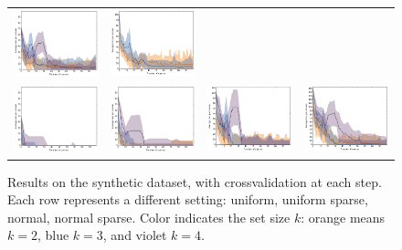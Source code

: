 \documentclass{article}
\renewcommand\[{\begin{equation}}
\renewcommand\]{\end{equation}}
\begin{document}
\begin{figure}[b]
\begin{tabular}{cccc}
        \includegraphics[width=12em]{figures/synthetic_5_normal_cv1_loss} &
        \includegraphics[width=12em]{figures/synthetic_6_normal_cv1_loss}
        \\
        \includegraphics[width=12em]{figures/synthetic_3_normal_sparse_cv1_loss} &
        \includegraphics[width=12em]{figures/synthetic_4_normal_sparse_cv1_loss} &
        \includegraphics[width=12em]{figures/synthetic_5_normal_sparse_cv1_loss} &
        \includegraphics[width=12em]{figures/synthetic_6_normal_sparse_cv1_loss}
    \end{tabular}
    \caption{Results on the synthetic dataset, with crossvalidation at each step. Each row represents a different
    setting: uniform, uniform sparse, normal, normal sparse. Color indicates
    the set size $k$: orange means $k=2$, blue $k=3$, and violet $k=4$.}
\end{figure}
\end{document}
